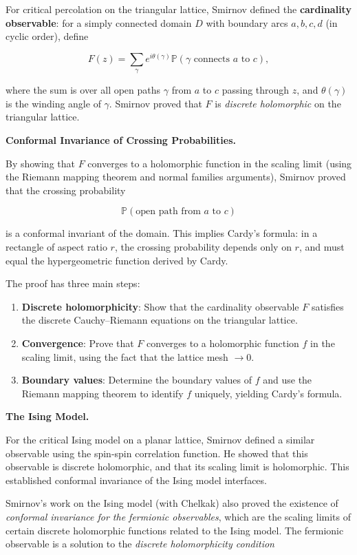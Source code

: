 For critical percolation on the triangular lattice, Smirnov defined the \textbf{cardinality observable}: for a simply connected domain $D$ with boundary arcs $a, b, c, d$ (in cyclic order), define

\[
F(z) = \sum_{\gamma} e^{i \theta(\gamma)} \mathbb{P}(\gamma \text{ connects } a \text{ to } c),
\]

where the sum is over all open paths $\gamma$ from $a$ to $c$ passing through $z$, and $\theta(\gamma)$ is the winding angle of $\gamma$. Smirnov proved that $F$ is \emph{discrete holomorphic} on the triangular lattice.

\textbf{Conformal Invariance of Crossing Probabilities.}

By showing that $F$ converges to a holomorphic function in the scaling limit (using the Riemann mapping theorem and normal families arguments), Smirnov proved that the crossing probability

\[
\mathbb{P}(\text{open path from } a \text{ to } c)
\]

is a conformal invariant of the domain. This implies Cardy's formula: in a rectangle of aspect ratio $r$, the crossing probability depends only on $r$, and must equal the hypergeometric function derived by Cardy.

The proof has three main steps:
\begin{enumerate}
  \item \textbf{Discrete holomorphicity}: Show that the cardinality observable $F$ satisfies the discrete Cauchy--Riemann equations on the triangular lattice.
  \item \textbf{Convergence}: Prove that $F$ converges to a holomorphic function $f$ in the scaling limit, using the fact that the lattice mesh $\to 0$.
  \item \textbf{Boundary values}: Determine the boundary values of $f$ and use the Riemann mapping theorem to identify $f$ uniquely, yielding Cardy's formula.
\end{enumerate}

\textbf{The Ising Model.}

For the critical Ising model on a planar lattice, Smirnov defined a similar observable using the spin-spin correlation function. He showed that this observable is discrete holomorphic, and that its scaling limit is holomorphic. This established conformal invariance of the Ising model interfaces.

Smirnov's work on the Ising model (with Chelkak) also proved the existence of \emph{conformal invariance for the fermionic observables}, which are the scaling limits of certain discrete holomorphic functions related to the Ising model. The fermionic observable is a solution to the \emph{discrete holomorphicity condition}

